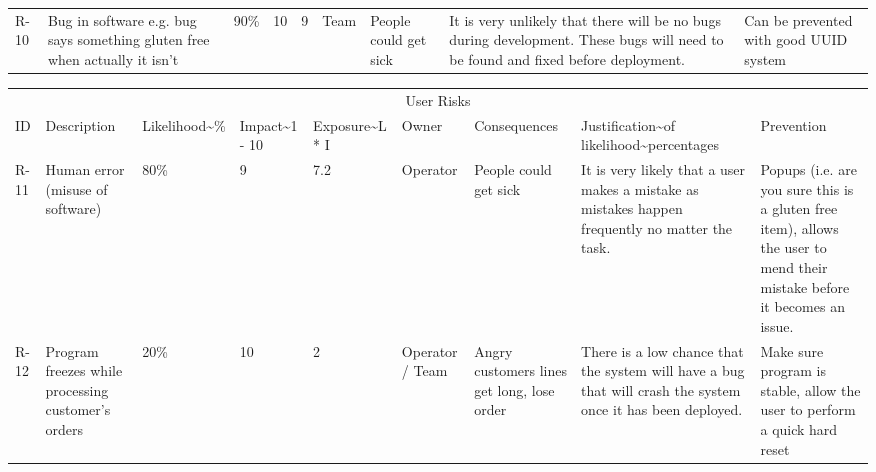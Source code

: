 \begin{table}
\begin{tabular}{lllllllll}
        R-10 & Bug in software e.g. bug says something gluten free when actually it isn’t & 90\%          & 10            & 9              & Team                & People could get sick                                                                        & It is very unlikely that there will be no bugs during development. These bugs will need to be found and fixed before deployment.                                                                                                                                       & Can be prevented with good UUID system
    \end{tabular}
\end{table}



\begin{table}
    \centering
    \begin{tabular}{lllllllll}
        \multicolumn{9}{c}{User Risks}                                                                                                                                                                                                                                                                                                                                                                                                                                                                                \\
        ID   & Description                                                                    & Likelihood\textasciitilde{}\% & Impact\textasciitilde{}1 - 10 & Exposure\textasciitilde{}L * I & Owner           & Consequences                               & Justification\textasciitilde{}of likelihood\textasciitilde{}percentages                                                   & Prevention                                                                                                                \\
        R-11 & Human error (misuse of software)                                               & 80\%                          & 9                             & 7.2                            & Operator        & People could get sick                      & It is very likely that a user makes a mistake as mistakes happen frequently no matter the task.                           & Popups (i.e. are you sure this is a gluten free item), allows the user to mend their mistake before it becomes an issue.  \\
        R-12 & Program freezes while processing customer’s orders                             & 20\%                          & 10                            & 2                              & Operator / Team & Angry customers lines get long, lose order & There is a low chance that the system will have a bug that will crash the system once it has been deployed.               & Make sure program is stable, allow the user to perform a quick hard reset                                                 \\

\end{tabular}
\end{table}
